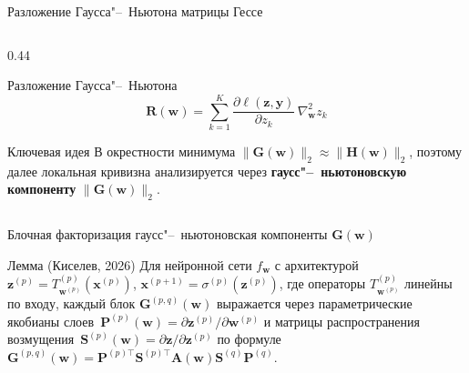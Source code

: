 \documentclass[aspectratio=169]{beamer}
\begin{document}
\begin{frame}{Разложение Гаусса"--~Ньютона матрицы Гессе}
\begin{columns}[T]
\begin{column}{0.44\textwidth}
\begin{block}{Разложение Гаусса"--~Ньютона}
\[                \mathbf R(\mathbf w)=\sum_{k=1}^{K}
                \frac{\partial \ell(\mathbf z,\mathbf y)}{\partial z_k}\,
                \nabla_{\mathbf w}^2 z_k
            \]
            \vspace{-1.2em}
        \end{block}
        \begin{block}{Ключевая идея}
            В окрестности минимума $\|\mathbf G(\mathbf w)\|_2 \approx \|\mathbf H(\mathbf w)\|_2$, поэтому далее локальная кривизна анализируется через \alert{\textbf{гаусс"--~ньютоновскую компоненту}} $\|\mathbf G(\mathbf w)\|_2$.
        \end{block}
    \end{column}
\end{columns}
\end{frame}

\begin{frame}{Блочная факторизация гаусс"--~ньютоновская компоненты $\mathbf{G}(\mathbf{w})$}
    \vspace{-0.6em}
    \begin{figure}[ht]
        \centering
        \resizebox{0.8\linewidth}{!}{}
    \end{figure}
    \vspace{-1.0em}
    \begin{block}{Лемма (Киселев, 2026)}
        Для нейронной сети $f_{\mathbf{w}}$ с архитектурой $\mathbf{z}^{(p)} = T_{\mathbf w^{(p)}}^{(p)}(\mathbf{x}^{(p)})$, $\mathbf{x}^{(p+1)} = \sigma^{(p)}(\mathbf{z}^{(p)})$, где операторы $T_{\mathbf w^{(p)}}^{(p)}$ линейны по входу, каждый блок $\mathbf{G}^{(p,q)}(\mathbf{w})$ выражается через параметрические якобианы слоев~$\mathbf{P}^{(p)}(\mathbf{w}) = \partial \mathbf{z}^{(p)} / \partial \mathbf{w}^{(p)}$ и матрицы распространения возмущения~$\mathbf{S}^{(p)}(\mathbf{w}) = \partial \mathbf{z} / \partial \mathbf{z}^{(p)}$ по формуле $\mathbf G^{(p,q)}(\mathbf w) = \mathbf P^{(p)\top}\mathbf S^{(p)\top}\mathbf A(\mathbf w)\mathbf S^{(q)}\mathbf P^{(q)}$.
    \end{block}
\end{frame}
\end{document}
